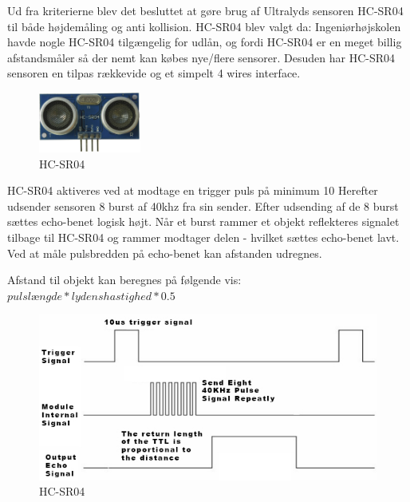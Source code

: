 \vspace{0.5cm}

Ud fra kriterierne blev det besluttet at gøre brug af Ultralyds sensoren HC-SR04 til både højdemåling og anti kollision. HC-SR04 blev valgt da: Ingeniørhøjskolen havde nogle HC-SR04 tilgængelig for udlån, og fordi HC-SR04 er en meget billig afstandsmåler så der nemt kan købes nye/flere sensorer. Desuden har HC-SR04 sensoren en tilpas rækkevide og et simpelt 4 wires interface. 

\begin{figure}[H]
\centering
\includegraphics[width=0.3\textwidth]{Billeder/Afstandsmaler/ultra_sensor.png}
\caption{HC-SR04}
\label{fig:HC-SR04}
\end{figure}

\newpage

HC-SR04 aktiveres ved at modtage en trigger puls på minimum 10 
Herefter udsender sensoren 8 burst af 40khz fra sin sender. Efter udsending af de 8 burst sættes echo-benet logisk højt. Når et burst rammer et objekt reflekteres signalet tilbage til HC-SR04 og rammer modtager delen - hvilket sættes echo-benet lavt. Ved at måle pulsbredden på echo-benet kan afstanden udregnes. 

Afstand til objekt kan beregnes på følgende vis: $pulslængde * lydenshastighed * 0.5$

\vspace{0.2cm}

\begin{figure}[H]
\centering
\includegraphics[width=1\textwidth]{Billeder/Afstandsmaler/ultra_schematic.png}
\caption{HC-SR04}
\label{fig:HC-SR04}
\end{figure}

\vspace{2cm}








